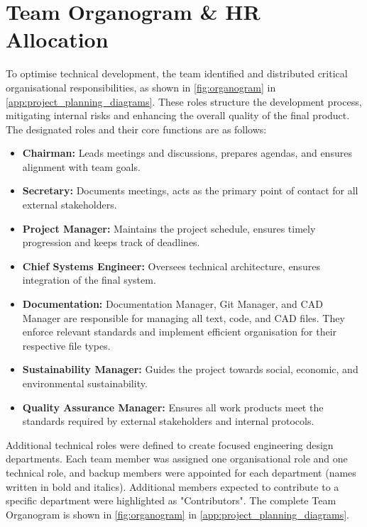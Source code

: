 \section{Team Organogram \& HR Allocation}
\label{sec:organogram}

To optimise technical development, the team identified and distributed critical organisational responsibilities, as shown in \autoref{fig:organogram} in \autoref{app:project_planning_diagrams}. These roles structure the development process, mitigating internal risks and enhancing the overall quality of the final product. The designated roles and their core functions are as follows:

\begin{itemize}
    \item \textbf{Chairman:} Leads meetings and discussions, prepares agendas, and ensures alignment with team goals.
    \item \textbf{Secretary:} Documents meetings, acts as the primary point of contact for all external stakeholders.
    \item \textbf{Project Manager:} Maintains the project schedule, ensures timely progression and keeps track of deadlines.
    \item \textbf{Chief Systems Engineer:} Oversees technical architecture, ensures integration of the final system.
    \item \textbf{Documentation:} Documentation Manager, Git Manager, and CAD Manager are responsible for managing all text, code, and CAD files. They enforce relevant standards and implement efficient organisation for their respective file types.
    \item \textbf{Sustainability Manager:} Guides the project towards social, economic, and environmental sustainability.
    \item \textbf{Quality Assurance Manager:} Ensures all work products meet the standards required by external stakeholders and internal protocols.
\end{itemize}

Additional technical roles were defined to create focused engineering design departments. Each team member was assigned one organisational role and one technical role, and backup members were appointed for each department (names written in bold and italics). Additional members expected to contribute to a specific department were highlighted as "Contributors". The complete Team Organogram is shown in \autoref{fig:organogram} in \autoref{app:project_planning_diagrams}.


